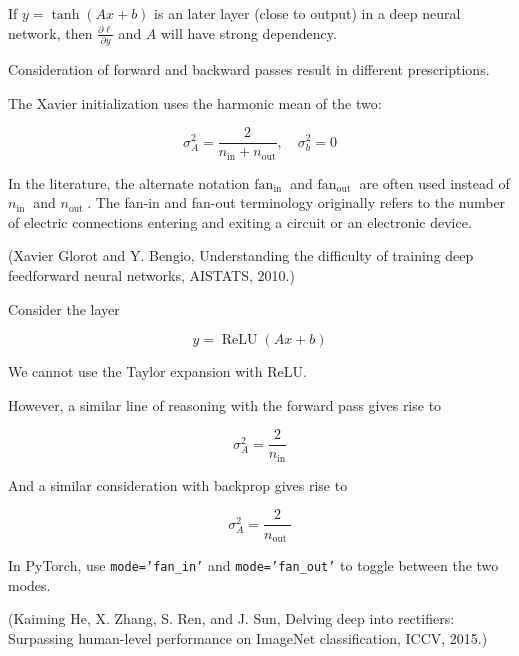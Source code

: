 \documentclass{report}
\begin{document}
\begin{definition}
    If $y=\tanh (A x+b)$ is an later layer (close to output) in a deep neural network, then $\frac{\partial \ell}{\partial y}$ and $A$ will have strong dependency.

    \par\noindent\textcolor{gray}{\hdashrule{\textwidth}{0.4pt}{1pt 2pt}}

    Consideration of forward and backward passes result in different prescriptions.

    The Xavier initialization uses the harmonic mean of the two:

    $$
    \sigma_{A}^{2}=\frac{2}{n_{\mathrm{in}}+n_{\mathrm{out}}}, \quad \sigma_{b}^{2}=0
    $$

    In the literature, the alternate notation $\text{fan}_{\text {in }}$ and $\text{fan}_{\text {out }}$ are often used instead of $n_{\text {in }}$ and $n_{\text {out }}$. The fan-in and fan-out terminology originally refers to the number of electric connections entering and exiting a circuit or an electronic device.

    (Xavier Glorot and Y. Bengio, Understanding the difficulty of training deep feedforward neural networks, AISTATS, 2010.)
\end{definition}

\begin{definition}
    Consider the layer

    $$
    y=\operatorname{ReLU}(A x+b)
    $$

    We cannot use the Taylor expansion with ReLU.

    However, a similar line of reasoning with the forward pass gives rise to

    $$
    \sigma_{A}^{2}=\frac{2}{n_{\mathrm{in}}}
    $$

    And a similar consideration with backprop gives rise to

    $$
    \sigma_{A}^{2}=\frac{2}{n_{\text {out }}}
    $$

    In PyTorch, use \texttt{mode='fan_in'} and \texttt{mode='fan_out'} to toggle between the two modes.

    (Kaiming He, X. Zhang, S. Ren, and J. Sun, Delving deep into rectifiers: Surpassing human-level performance on ImageNet classification, ICCV, 2015.)
\end{definition}
\end{document}
